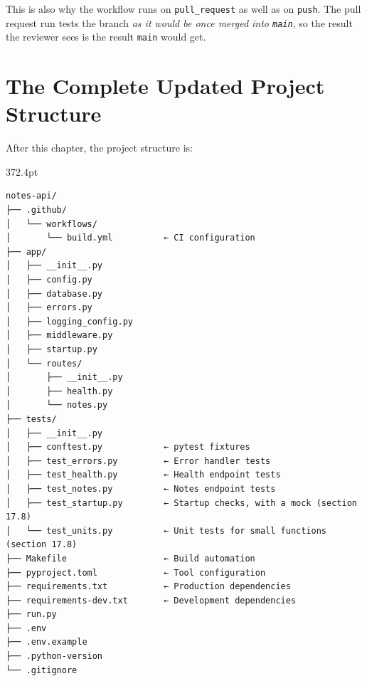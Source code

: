 This is also why the workflow runs on \texttt{pull\_request} as well as on \texttt{push}. The pull request run tests the branch \emph{as it would be once merged into \texttt{main}}, so the result the reviewer sees is the result \texttt{main} would get.

\setcounter{section}{10}
\section{The Complete Updated Project Structure}\label{17-build-process:1711-the-complete-updated-project-structure}

After this chapter, the project structure is:

\begin{diagrambox}[short]{372.4pt}
\begin{Verbatim}[fontsize=\fontsize{9.0}{8.55}\selectfont]
notes-api/
├── .github/
│   └── workflows/
│       └── build.yml          ← CI configuration
├── app/
│   ├── __init__.py
│   ├── config.py
│   ├── database.py
│   ├── errors.py
│   ├── logging_config.py
│   ├── middleware.py
│   ├── startup.py
│   └── routes/
│       ├── __init__.py
│       ├── health.py
│       └── notes.py
├── tests/
│   ├── __init__.py
│   ├── conftest.py            ← pytest fixtures
│   ├── test_errors.py         ← Error handler tests
│   ├── test_health.py         ← Health endpoint tests
│   ├── test_notes.py          ← Notes endpoint tests
│   ├── test_startup.py        ← Startup checks, with a mock (section 17.8)
│   └── test_units.py          ← Unit tests for small functions (section 17.8)
├── Makefile                   ← Build automation
├── pyproject.toml             ← Tool configuration
├── requirements.txt           ← Production dependencies
├── requirements-dev.txt       ← Development dependencies
├── run.py
├── .env
├── .env.example
├── .python-version
└── .gitignore
\end{Verbatim}
\end{diagrambox}

